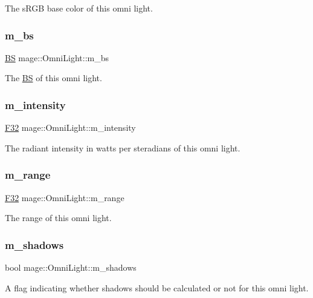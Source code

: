 The s\+R\+GB base color of this omni light. \hypertarget{classmage_1_1_omni_light_a11653a2018fbfddf5ecfcdfaa6449ccf}{}\label{classmage_1_1_omni_light_a11653a2018fbfddf5ecfcdfaa6449ccf} 
\subsubsection{\texorpdfstring{m\+\_\+bs}{m\_bs}}
{\footnotesize\ttfamily \hyperlink{classmage_1_1_b_s}{BS} mage\+::\+Omni\+Light\+::m\+\_\+bs\hspace{0.3cm}{\ttfamily [private]}}

The \hyperlink{classmage_1_1_b_s}{BS} of this omni light. \hypertarget{classmage_1_1_omni_light_aa0cbdebabf3ce0d8bbaeff7cf88cadd0}{}\label{classmage_1_1_omni_light_aa0cbdebabf3ce0d8bbaeff7cf88cadd0} 
\subsubsection{\texorpdfstring{m\+\_\+intensity}{m\_intensity}}
{\footnotesize\ttfamily \hyperlink{namespacemage_aa97e833b45f06d60a0a9c4fc22ae02c0}{F32} mage\+::\+Omni\+Light\+::m\+\_\+intensity\hspace{0.3cm}{\ttfamily [private]}}

The radiant intensity in watts per steradians of this omni light. \hypertarget{classmage_1_1_omni_light_a0427a9c7f90750c645cd67ef0bafce47}{}\label{classmage_1_1_omni_light_a0427a9c7f90750c645cd67ef0bafce47} 
\subsubsection{\texorpdfstring{m\+\_\+range}{m\_range}}
{\footnotesize\ttfamily \hyperlink{namespacemage_aa97e833b45f06d60a0a9c4fc22ae02c0}{F32} mage\+::\+Omni\+Light\+::m\+\_\+range\hspace{0.3cm}{\ttfamily [private]}}

The range of this omni light. \hypertarget{classmage_1_1_omni_light_a63e5dab12be5021815e98c81dd9aed6a}{}\label{classmage_1_1_omni_light_a63e5dab12be5021815e98c81dd9aed6a} 
\subsubsection{\texorpdfstring{m\+\_\+shadows}{m\_shadows}}
{\footnotesize\ttfamily bool mage\+::\+Omni\+Light\+::m\+\_\+shadows\hspace{0.3cm}{\ttfamily [private]}}

A flag indicating whether shadows should be calculated or not for this omni light. 